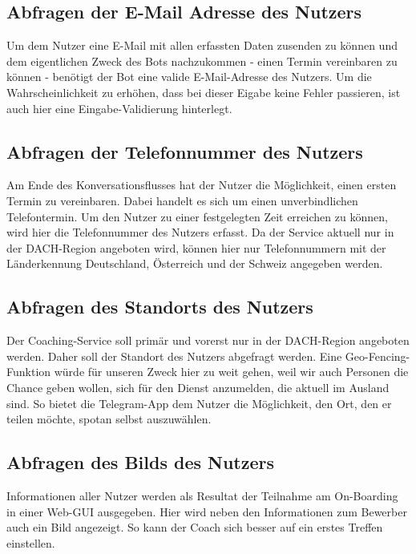         \subsection{Abfragen der E-Mail Adresse des Nutzers}
            Um dem Nutzer eine E-Mail mit allen erfassten Daten zusenden zu können und dem eigentlichen Zweck des Bots nachzukommen - einen Termin vereinbaren zu können - benötigt der Bot eine valide E-Mail-Adresse des Nutzers. Um die Wahrscheinlichkeit zu erhöhen, dass bei dieser Eigabe keine Fehler passieren, ist auch hier eine Eingabe-Validierung hinterlegt.
        
        \subsection{Abfragen der Telefonnummer des Nutzers}
            Am Ende des Konversationsflusses hat der Nutzer die Möglichkeit, einen ersten Termin zu vereinbaren. Dabei handelt es sich um einen unverbindlichen Telefontermin. Um den Nutzer zu einer festgelegten Zeit erreichen zu können, wird hier die Telefonnummer des Nutzers erfasst. Da der Service aktuell nur in der DACH-Region angeboten wird, können hier nur Telefonnummern mit der Länderkennung Deutschland, Österreich und der Schweiz angegeben werden. 
        
        \subsection{Abfragen des Standorts des Nutzers}
            Der Coaching-Service soll primär und vorerst nur in der DACH-Region angeboten werden. Daher soll der Standort des Nutzers abgefragt werden. Eine Geo-Fencing-Funktion würde für unseren Zweck hier zu weit gehen, weil wir auch Personen die Chance geben wollen, sich für den Dienst anzumelden, die aktuell im Ausland sind. So bietet die Telegram-App dem Nutzer die Möglichkeit, den Ort, den er teilen möchte, spotan selbst auszuwählen.
        
        \subsection{Abfragen des Bilds des Nutzers}
        Informationen aller Nutzer werden als Resultat der Teilnahme am On-Boarding in einer Web-GUI ausgegeben. Hier wird neben den Informationen zum Bewerber auch ein Bild angezeigt. So kann der Coach sich besser auf ein erstes Treffen einstellen. 
        
